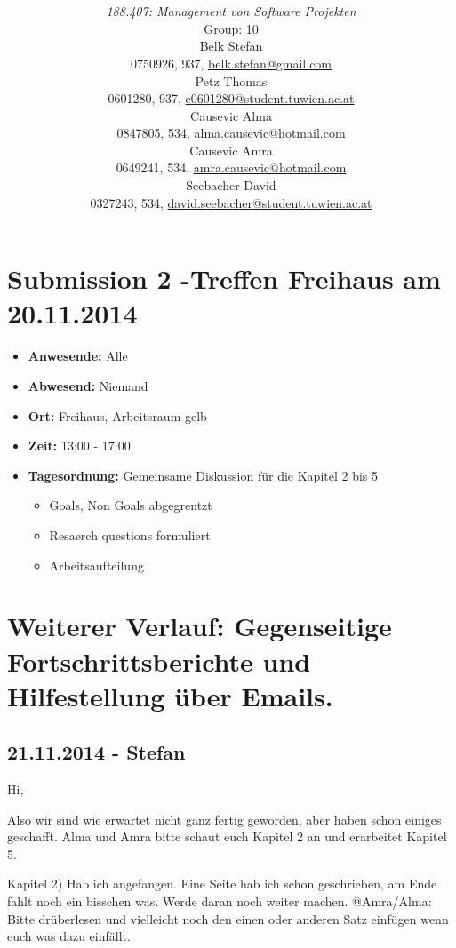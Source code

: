 \documentclass[a4paper,11pt]{article}
\title{\textbf{\sffamily\Huge \ShortTitle}\\ 
{\textbf{\sffamily\Large \FullTitle}}
\vspace{1cm}}
\author{
{\em 188.407: Management von Software Projekten} \vspace{1cm} \\
Group: 10\bigskip \\
Belk Stefan \\ {\small 0750926, 937, \href{mailto:belk.stefan@gmail.com}{belk.stefan@gmail.com}}\\
Petz Thomas \\ {\small 0601280, 937, \href{mailto:e0601280@student.tuwien.ac.at}{e0601280@student.tuwien.ac.at}}\\
Causevic Alma \\ {\small 0847805, 534, \href{mailto:alma.causevic@hotmail.com}{alma.causevic@hotmail.com}}\\ 
Causevic Amra  \\ {\small 0649241, 534, \href{mailto:amra.causevic@hotmail.com}{amra.causevic@hotmail.com}}\\ 
Seebacher David \\ {\small 0327243, 534, \href{mailto:david.seebacher@student.tuwien.ac.at}{david.seebacher@student.tuwien.ac.at}}\\
\vspace{4cm}
}
\begin{document}
\begin{titlepage}
\maketitle

\end{titlepage}


\section{Submission 2 -Treffen Freihaus am 20.11.2014}

\begin{itemize}
\item
  \textbf{Anwesende:} Alle
\item
  \textbf{Abwesend:} Niemand
\item
  \textbf{Ort:} Freihaus, Arbeitsraum gelb
\item
  \textbf{Zeit:} 13:00 - 17:00
\item
  \textbf{Tagesordnung:} Gemeinsame Diskussion für die Kapitel 2 bis 5
\begin{itemize}
  \itemsep1pt\parskip0pt
  \item Goals, Non Goals abgegrentzt
  \item Resaerch questions formuliert
  \item Arbeitsaufteilung
\end{itemize}
\end{itemize}  
  
\section{Weiterer Verlauf: Gegenseitige Fortschrittsberichte und Hilfestellung über Emails.}

\subsection{21.11.2014 - Stefan}
Hi,

Also wir sind wie erwartet nicht ganz fertig geworden, aber haben schon einiges geschafft.
Alma und Amra bitte schaut euch Kapitel 2 an und erarbeitet Kapitel 5.

Kapitel 2)
Hab ich angefangen. Eine Seite hab ich schon geschrieben, am Ende fahlt noch ein bisschen was. Werde daran noch weiter machen. 
@Amra/Alma: Bitte drüberlesen und vielleicht noch den einen oder anderen Satz einfügen wenn euch was dazu einfällt. 
\end{document}
